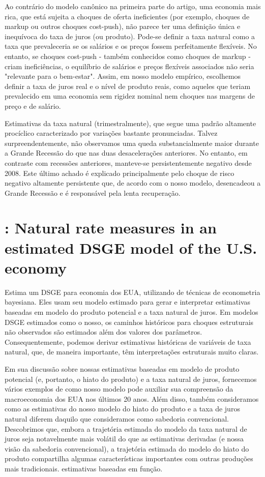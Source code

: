 \documentclass[11pt,oneside,a4paper]{article}
\begin{document}
Ao contrário do modelo canônico na primeira parte do artigo, uma economia mais rica, que está sujeita a choques de oferta ineficientes (por exemplo, choques de markup ou outros choques cost-push), não parece ter uma definição única e inequívoca do taxa de juros (ou produto). Pode-se definir a taxa natural como a taxa que prevaleceria se os salários e os preços fossem perfeitamente flexíveis. No entanto, se choques cost-push - também conhecidos como choques de markup - criam ineficiências, o equilíbrio de salários e preços flexíveis associados não seria "relevante para o bem-estar". Assim, em nosso modelo empírico, escolhemos definir a taxa de juros real e o nível de produto reais, como aqueles que teriam prevalecido em uma economia sem rigidez nominal nem choques nas margens de preço e de salário.

Estimativas da taxa natural (trimestralmente), que segue uma padrão altamente procíclico caracterizado por variações bastante pronunciadas. Talvez surpreendentemente, não observamos uma queda substancialmente maior durante a Grande Recessão do que nas duas desacelerações anteriores. No entanto, em contraste com recessões anteriores, manteve-se persistentemente negativo desde 2008. Este último achado é explicado principalmente pelo choque de risco negativo altamente persistente que, de acordo com o nosso modelo, desencadeou a Grande Recessão e é responsável pela lenta recuperação.
%
%
\section{\citet{Edge:2008}: Natural rate measures in an estimated DSGE model of the U.S. economy  }
Estima um DSGE para economia dos EUA, utilizando de técnicas de econometria bayesiana. Eles usam seu modelo estimado para gerar e interpretar estimativas baseadas em modelo do produto potencial e a taxa natural de juros. Em modelos DSGE estimados como o nosso, os caminhos históricos para choques estruturais não observados são estimados além dos valores dos parâmetros. Consequentemente, podemos derivar estimativas históricas de variáveis de taxa natural, que, de maneira importante, têm interpretações estruturais muito claras.

Em sua discussão sobre nossas estimativas baseadas em modelo de produto potencial (e, portanto, o hiato do produto) e a taxa natural de juros, fornecemos vários exemplos de como nosso modelo pode auxiliar sua compreensão da macroeconomia dos EUA nos últimos 20 anos. Além disso, também consideramos como as estimativas do nosso modelo do hiato do produto e a taxa de juros natural diferem daquilo que consideramos como sabedoria convencional. Descobrimos que, embora a trajetória estimada do modelo da taxa natural de juros seja notavelmente mais volátil do que as estimativas derivadas (e nossa visão da sabedoria convencional), a trajetória estimada do modelo do hiato do produto compartilha algumas características importantes com outras produções mais tradicionais. estimativas baseadas em função.
\end{document}
